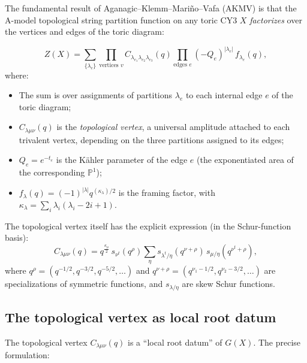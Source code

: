 \documentclass[11pt]{amsart}
\theoremstyle{plain}
\theoremstyle{definition}
\theoremstyle{remark}
\begin{document}
The fundamental result of Aganagic--Klemm--Mari\~no--Vafa (AKMV) is that the
A-model topological string partition function on any toric CY3 $X$
\emph{factorizes} over the vertices and edges of the toric diagram:

\begin{equation}\label{eq:top-vertex-Z}
 Z(X) = \sum_{\{\lambda_e\}} \prod_{\text{vertices } v}
 C_{\lambda_{e_1} \lambda_{e_2} \lambda_{e_3}}(q)
 \prod_{\text{edges } e} (-Q_e)^{|\lambda_e|}\, f_{\lambda_e}(q),
\end{equation}
where:
\begin{itemize}
 \item The sum is over assignments of partitions $\lambda_e$ to each internal
 edge $e$ of the toric diagram;
 \item $C_{\lambda\mu\nu}(q)$ is the \emph{topological vertex}, a
 universal amplitude attached to each trivalent vertex, depending on the
 three partitions assigned to its edges;
 \item $Q_e = e^{-t_e}$ is the K\"ahler parameter of the edge $e$ (the
 exponentiated area of the corresponding $\mathbb{P}^1$);
 \item $f_{\lambda}(q) = (-1)^{|\lambda|} q^{(\kappa_\lambda)/2}$ is the
 framing factor, with $\kappa_\lambda = \sum_i \lambda_i(\lambda_i - 2i + 1)$.
\end{itemize}

The topological vertex itself has the explicit expression (in the
Schur-function basis):
\begin{equation}\label{eq:c-vertex}
 C_{\lambda\mu\nu}(q) = q^{\frac{\kappa_\mu}{2}}\, s_{\nu^t}(q^\rho)
 \sum_\eta s_{\lambda^t/\eta}(q^{\nu + \rho})\, s_{\mu/\eta}(q^{\nu^t + \rho}),
\end{equation}
where $q^\rho = (q^{-1/2}, q^{-3/2}, q^{-5/2}, \ldots)$ and
$q^{\nu + \rho} = (q^{\nu_1 - 1/2}, q^{\nu_2 - 3/2}, \ldots)$ are
specializations of symmetric functions, and $s_{\lambda/\eta}$ are skew Schur
functions.

\subsection{The topological vertex as local root datum}
\label{sub:vertex-root-datum}

The topological vertex $C_{\lambda\mu\nu}(q)$ is a ``local root datum'' of
$G(X)$. The precise formulation:
\end{document}
